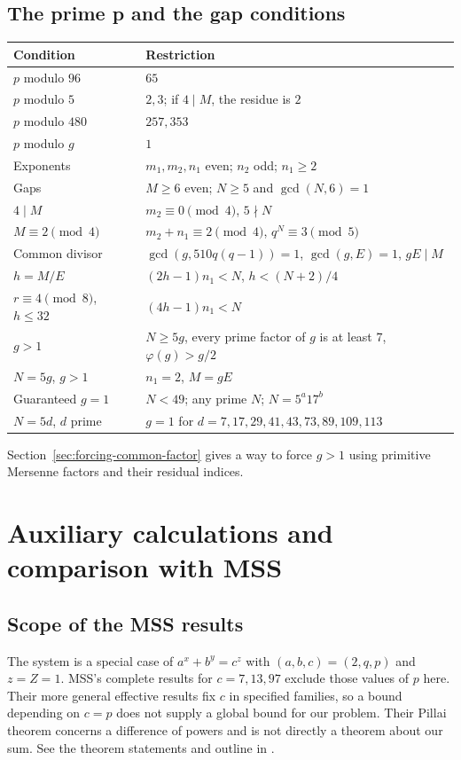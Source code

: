 \documentclass[11pt]{article}
\begin{document}
\subsection{The prime p and the gap conditions}
{\small\renewcommand{\arraystretch}{1.15}
\begin{longtable}{@{}p{}p{}@{}}
\textbf{Condition}&\textbf{Restriction}\\\hline
\endhead
$p$ modulo $96$&$65$\\
$p$ modulo $5$&$2,3$; if $4\mid M$, the residue is $2$\\
$p$ modulo $480$&$257,353$\\
$p$ modulo $g$&$1$\\\hline
Exponents&$m_1,m_2,n_1$ even; $n_2$ odd; $n_1\ge2$\\
Gaps&$M\ge6$ even; $N\ge5$ and $\gcd(N,6)=1$\\
$4\mid M$&$m_2\equiv0\pmod4$, $5\nmid N$\\
$M\equiv2\pmod4$&$m_2+n_1\equiv2\pmod4$, $q^N\equiv3\pmod5$\\
Common divisor&$\gcd(g,510q(q-1))=1$, $\gcd(g,E)=1$, $gE\mid M$\\
$h=M/E$&$(2h-1)n_1<N$, $h<(N+2)/4$\\
$r\equiv4\pmod8$, $h\le32$&$(4h-1)n_1<N$\\
$g>1$&$N\ge5g$, every prime factor of $g$ is at least $7$,
$\varphi(g)>g/2$\\
$N=5g$, $g>1$&$n_1=2$, $M=gE$\\
Guaranteed $g=1$&$N<49$; any prime $N$; $N=5^a17^b$\\
$N=5d$, $d$ prime&$g=1$ for $d=7,17,29,41,43,73,89,109,113$\\\hline
\end{longtable}}
Section~\ref{sec:forcing-common-factor} gives a way to force $g>1$
using primitive Mersenne factors and their residual indices.

\clearpage
\section{Auxiliary calculations and comparison with MSS}
\label{sec:auxiliary}

\subsection{Scope of the MSS results}

The system is a special case of $a^x+b^y=c^z$ with
$(a,b,c)=(2,q,p)$ and $z=Z=1$. MSS's complete results for
$c=7,13,97$ exclude those values of $p$ here. Their more general effective
results fix $c$ in specified families, so a bound depending on $c=p$
does not supply a global bound for our problem. Their Pillai theorem
concerns a difference of powers and is not directly a theorem about
our sum. See the theorem statements and outline in \cite{MSS}.
\end{document}

